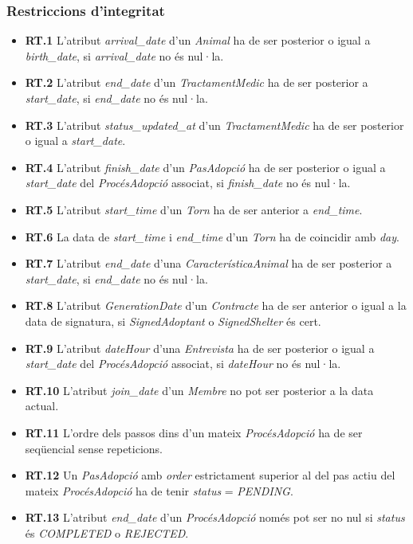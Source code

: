 \documentclass[11pt,a4paper]{report}
\begin{document}
\subsubsection{Restriccions d'integritat}
\begin{itemize}
    \item \textbf{RT.1} L'atribut \textit{arrival\_date} d'un \textit{Animal} ha de ser posterior o igual a \textit{birth\_date}, si \textit{arrival\_date} no és nul·la.
    \item \textbf{RT.2} L'atribut \textit{end\_date} d'un \textit{TractamentMedic} ha de ser posterior a \textit{start\_date}, si \textit{end\_date} no és nul·la.
    \item \textbf{RT.3} L'atribut \textit{status\_updated\_at} d'un \textit{TractamentMedic} ha de ser posterior o igual a \textit{start\_date}.
    \item \textbf{RT.4} L'atribut \textit{finish\_date} d'un \textit{PasAdopció} ha de ser posterior o igual a \textit{start\_date} del \textit{ProcésAdopció} associat, si \textit{finish\_date} no és nul·la.
    \item \textbf{RT.5} L'atribut \textit{start\_time} d'un \textit{Torn} ha de ser anterior a \textit{end\_time}.
    \item \textbf{RT.6} La data de \textit{start\_time} i \textit{end\_time} d'un \textit{Torn} ha de coincidir amb \textit{day}.
    \item \textbf{RT.7} L'atribut \textit{end\_date} d'una \textit{CaracterísticaAnimal} ha de ser posterior a \textit{start\_date}, si \textit{end\_date} no és nul·la.
    \item \textbf{RT.8} L'atribut \textit{GenerationDate} d'un \textit{Contracte} ha de ser anterior o igual a la data de signatura, si \textit{SignedAdoptant} o \textit{SignedShelter} és cert.
    \item \textbf{RT.9} L'atribut \textit{dateHour} d'una \textit{Entrevista} ha de ser posterior o igual a \textit{start\_date} del \textit{ProcésAdopció} associat, si \textit{dateHour} no és nul·la.
    \item \textbf{RT.10} L'atribut \textit{join\_date} d'un \textit{Membre} no pot ser posterior a la data actual.
    \item \textbf{RT.11} L'ordre dels passos dins d'un mateix \textit{ProcésAdopció} ha de ser seqüencial sense repeticions.
    \item \textbf{RT.12} Un \textit{PasAdopció} amb \textit{order} estrictament superior al del pas actiu del mateix \textit{ProcésAdopció} ha de tenir \textit{status} = \textit{PENDING}.
    \item \textbf{RT.13} L'atribut \textit{end\_date} d'un \textit{ProcésAdopció} només pot ser no nul si \textit{status} és \textit{COMPLETED} o \textit{REJECTED}.
\end{itemize}
\end{document}
